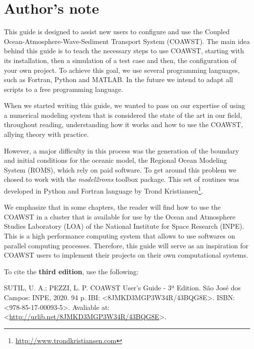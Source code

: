 \chapter*{Author's note}
\bigskip
\noindent This guide is designed to assist new users to configure and use the Coupled Ocean-Atmosphere-Wave-Sediment Transport System (COAWST).
The main idea behind this  guide is to teach the necessary steps to use COAWST, starting with its installation, then a simulation of a test case and 
then, the configuration of your own project. To achieve this goal, we use several programming languages, such as Fortran, Python and MATLAB. In the future we intend to adapt all scripts
to a free programming language.
\bigskip

\noindent When we started writing this guide, we wanted to pass on our expertise of using a numerical modeling system that is considered the state of the art in our field, 
throughout reading, understanding how it works and how to use the COAWST, allying theory with practice.
\bigskip

\noindent However, a major difficulty in this process was the generation of the boundary and initial conditions for the oceanic model, the Regional Ocean Modeling System (ROMS),
which rely on paid software. To get around this problem we chosed to work with the \textit {model2roms} toolbox package. This set of routines was developed in Python and 
Fortran language by Trond Kristiansen\textcolor{bleu_cite}{\textit{}\footnote{\textcolor{bleu_cite}{\href{http://www.trondkristiansen.com}{http://www.trondkristiansen.com}}}}. 
\bigskip

\noindent We emphasize that in some chapters, the reader will find how to use the COAWST in a cluster that is available for use by the Ocean and Atmosphere 
Studies Laboratory (LOA) of the National Institute for Space Research (INPE). This is a high performance computing system that allows to use softwares on 
parallel computing processes. Therefore, this guide will serve as an inspiration for COAWST users to implement their projects on their own computational systems.
\bigskip

\noindent To cite the \textbf{third edition}, use the following:
\bigskip

\noindent SUTIL, U. A.; PEZZI, L. P. COAWST User's Guide - 3ª Edition. São José dos Campos: INPE, 2020. 94 p. IBI: <8JMKD3MGP3W34R/43BQG8E>. ISBN: <978-85-17-00093-5>. Avaliable at: <\textcolor{bleu_cite}{\href{http://urlib.net/8JMKD3MGP3W34R/43BQG8E}{http://urlib.net/8JMKD3MGP3W34R/43BQG8E}}>. 
\bigskip
\newpage

